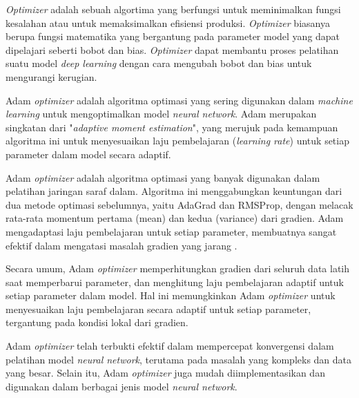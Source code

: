 \textit{Optimizer} adalah sebuah algortima yang berfungsi untuk meminimalkan fungsi kesalahan atau untuk memaksimalkan efisiensi produksi. \textit{Optimizer} biasanya berupa fungsi matematika yang bergantung pada parameter model yang dapat dipelajari seberti bobot dan bias. \textit{Optimizer} dapat membantu proses pelatihan suatu model \textit{deep learning} dengan cara mengubah bobot dan bias untuk mengurangi kerugian.

Adam \textit{optimizer} adalah algoritma optimasi yang sering digunakan dalam \textit{machine learning} untuk mengoptimalkan model \textit{neural network}. Adam merupakan singkatan dari "\textit{adaptive moment estimation}", yang merujuk pada kemampuan algoritma ini untuk menyesuaikan laju pembelajaran (\textit{learning rate}) untuk setiap parameter dalam model secara adaptif.

Adam \textit{optimizer} adalah algoritma optimasi yang banyak digunakan dalam pelatihan jaringan saraf dalam. Algoritma ini menggabungkan keuntungan dari dua metode optimasi sebelumnya, yaitu AdaGrad dan RMSProp, dengan melacak rata-rata momentum pertama (mean) dan kedua (variance) dari gradien. Adam mengadaptasi laju pembelajaran untuk setiap parameter, membuatnya sangat efektif dalam mengatasi masalah gradien yang jarang \cite{bock2019}.

Secara umum, Adam \textit{optimizer} memperhitungkan gradien dari seluruh data latih saat memperbarui parameter, dan menghitung laju pembelajaran adaptif untuk setiap parameter dalam model. Hal ini memungkinkan Adam \textit{optimizer} untuk menyesuaikan laju pembelajaran secara adaptif untuk setiap parameter, tergantung pada kondisi lokal dari gradien.

Adam \textit{optimizer} telah terbukti efektif dalam mempercepat konvergensi dalam pelatihan model \textit{neural network}, terutama pada masalah yang kompleks dan data yang besar. Selain itu, Adam \textit{optimizer} juga mudah diimplementasikan dan digunakan dalam berbagai jenis model \textit{neural network}.

